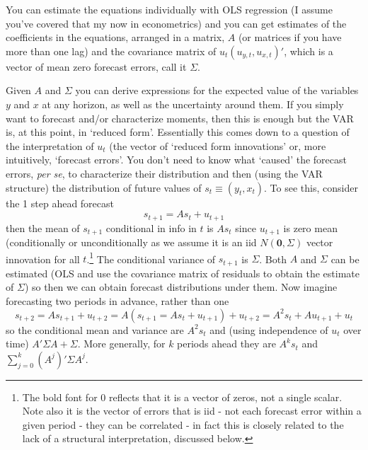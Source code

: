 \documentclass[authoryear,11pt]{elsarticle}
\begin{document}
You can estimate the equations individually with OLS regression (I assume you've covered that my now in econometrics) and you can get estimates of the coefficients in the equations, arranged in a matrix, $A$ (or matrices if you have more than one lag) and the covariance matrix of $u_{t} (u_{y,t}, u_{x,t})'$, which is a vector of mean zero forecast errors, call it $\Sigma$.

Given $A$ and $\Sigma$ you can derive expressions for the expected value of the variables $y$ and $x$ at any horizon, as well as the uncertainty around them. If you simply want to forecast and/or characterize moments, then this is enough but the VAR is, at this point, in `reduced form'. Essentially this comes down to a question of the interpretation of $u_{t}$ (the vector of `reduced form innovations' or, more intuitively, `forecast errors'. You don't need to know what `caused' the forecast errors, \textit{per se}, to characterize their distribution and then (using the VAR structure) the distribution of future values of $s_{t} \equiv (y_{t},x_{t})$. To see this, consider the 1 step ahead forecast
\begin{equation}
s_{t+1} = A s_{t} + u_{t+1}
\end{equation}
then the mean of $s_{t+1}$ conditional in info in $t$ is $A s_{t}$ since $u_{t+1}$ is zero mean (conditionally or unconditionally as we assume it is an iid $N(\textbf{0},\Sigma)$ vector innovation for all $t$.\footnote{The bold font for 0 reflects that it is a vector of zeros, not a single scalar. Note also it is the vector of errors that is iid - not each forecast error within a given period - they can be correlated - in fact this is closely related to the lack of a structural interpretation, discussed below.} The conditional variance of $s_{t+1}$ is $\Sigma$. Both $A$ and $\Sigma$ can be estimated (OLS and use the covariance matrix of residuals to obtain the estimate of $\Sigma$) so then we can obtain forecast distributions under them. Now imagine forecasting two periods in advance, rather than one
\begin{equation}
s_{t+2} = A s_{t+1} + u_{t+2} = A ( s_{t+1} = A s_{t} + u_{t+1} ) + u_{t+2} = A^{2} s_{t} + A u_{t+1} + u_{t}
\end{equation}
so the conditional mean and variance are $A^{2} s_{t}$ and (using independence of $u_{t}$ over time) $A'\Sigma A + \Sigma$. More generally, for $k$ periods ahead they are $A^{k} s_{t}$ and $\sum\limits_{j=0}^{k} (A^{j})'\Sigma A^{j}$.
\end{document}
